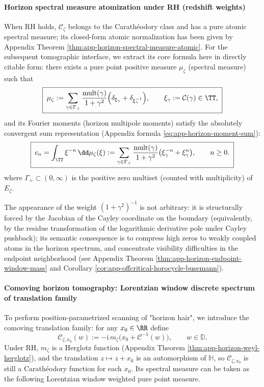 \paragraph{Horizon spectral measure atomization under RH (redshift weights)}
When RH holds, \(\mathscr{C}_{\zeta}\) belongs to the Carath\'eodory class and has a pure atomic spectral measure; its closed-form atomic normalization has been given by Appendix Theorem \ref{thm:app-horizon-spectral-measure-atomic}.
For the subsequent tomographic interface, we extract its core formula here in directly citable form:
there exists a pure point positive measure \(\mu_{\zeta}\) (spectral measure) such that
\begin{equation}\label{eq:xi-horizon-mu-atomic-recall}
\boxed{\;
\mu_{\zeta}
:=
\sum_{\gamma\in\Gamma_+}\frac{\mathrm{mult}(\gamma)}{1+\gamma^2}\Bigl(\delta_{\xi_{\gamma}}+\delta_{\xi_{\gamma}^{-1}}\Bigr),
\qquad \xi_{\gamma}:=\mathcal{C}(\gamma)\in\TT,
\;}
\end{equation}
and its Fourier moments (horizon multipole moments) satisfy the absolutely convergent sum representation (Appendix formula \eqref{eq:app-horizon-moment-sum}):
\begin{equation}\label{eq:xi-horizon-moment-sum-recall}
\boxed{\;
c_n=\int_{\TT}\xi^{-n}\,\dd\mu_{\zeta}(\xi)
:=
\sum_{\gamma\in\Gamma_+}\frac{\mathrm{mult}(\gamma)}{1+\gamma^2}\bigl(\xi_{\gamma}^{-n}+\xi_{\gamma}^{n}\bigr),
\qquad n\ge 0.
\;}
\end{equation}
where \(\Gamma_+\subset(0,\infty)\) is the positive zero multiset (counted with multiplicity) of \(E_{\zeta}\).
\par
The appearance of the weight \((1+\gamma^2)^{-1}\) is not arbitrary: it is structurally forced by the Jacobian of the Cayley coordinate on the boundary (equivalently, by the residue transformation of the logarithmic derivative pole under Cayley pushback); its semantic consequence is to compress high zeros to weakly coupled atoms in the horizon spectrum, and concentrate visibility difficulties in the endpoint neighborhood (see Appendix Theorem \ref{thm:app-horizon-endpoint-window-mass} and Corollary \ref{cor:app-offcritical-horocycle-busemann}).

\paragraph{Comoving horizon tomography: Lorentzian window discrete spectrum of translation family}
To perform position-parametrized scanning of "horizon hair", we introduce the comoving translation family: for any \(x_0\in\RR\) define
\begin{equation}\label{eq:xi-horizon-comoving-carath-def}
\boxed{\;
\mathscr{C}_{\zeta,x_0}(w):=-\mathrm{i}\,m_{\zeta}\!\bigl(x_0+\mathcal{C}^{-1}(w)\bigr),
\qquad w\in\mathbb{D}.
\;}
\end{equation}
Under RH, \(m_{\zeta}\) is a Herglotz function (Appendix Theorem \ref{thm:app-horizon-weyl-herglotz}), and the translation \(z\mapsto z+x_0\) is an automorphism of \(\mathbb{H}\), so \(\mathscr{C}_{\zeta,x_0}\) is still a Carath\'eodory function for each \(x_0\).
Its spectral measure can be taken as the following Lorentzian window weighted pure point measure.

